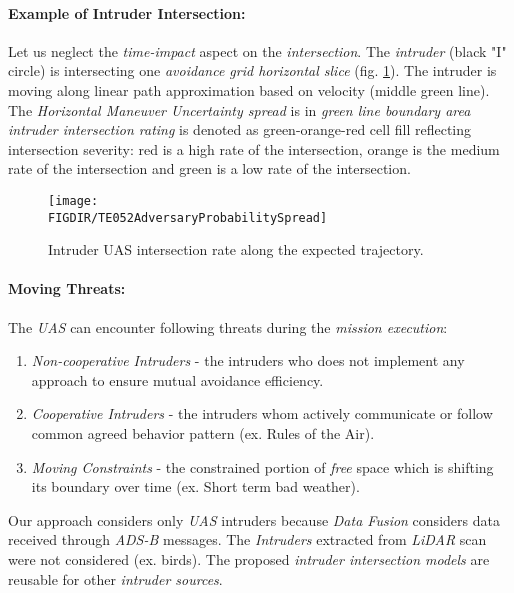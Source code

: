 \paragraph{Example of Intruder Intersection:} Let us neglect the \emph{time-impact} aspect on the \emph{intersection}.  The \emph{intruder} (black "I" circle) is intersecting one \emph{avoidance grid horizontal slice} (fig. \ref{fig:intruderProbabiltySpreadTheoretical}).  The intruder is moving along linear path approximation based on velocity (middle green line). The \emph{Horizontal Maneuver Uncertainty spread} is in \emph{green line boundary area} \emph{intruder intersection rating} is denoted as green-orange-red cell fill reflecting intersection severity:  red is a high rate of the intersection, orange is the medium rate of the intersection and green is a low rate of the intersection.
    

\begin{figure}[H]
    \centering
    \texttt{[image: \\FIGDIR/TE052AdversaryProbabilitySpread]}
    \caption{Intruder UAS intersection rate along the expected trajectory.}
    \label{fig:intruderProbabiltySpreadTheoretical}
\end{figure}   

\paragraph{Moving Threats:} The \emph{UAS} can encounter following threats during the \emph{mission execution}:
\begin{enumerate}
    \item \emph{Non-cooperative Intruders} - the intruders who does not implement any approach to ensure mutual avoidance efficiency.
    
    \item \emph{Cooperative Intruders} - the intruders whom actively communicate or follow common agreed behavior pattern (ex. Rules of the Air).
    
    \item \emph{Moving Constraints} - the constrained portion of \emph{free} space which is shifting its boundary over time (ex. Short term bad weather).
\end{enumerate}
    
\begin{note}
    Our approach considers only \emph{UAS} intruders because \emph{Data Fusion} considers data received through \emph{ADS-B} messages. The \emph{Intruders} extracted from \emph{LiDAR} scan were not considered (ex. birds). The proposed \emph{intruder intersection models} are reusable for other \emph{intruder sources}.
\end{note}

